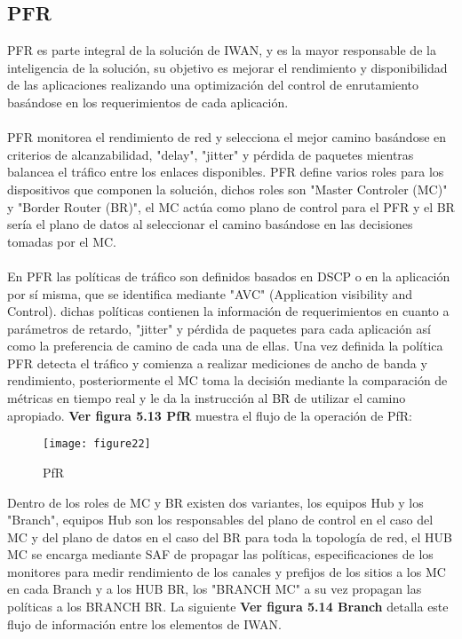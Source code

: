 \subsection{PFR}
\label{sec:PFR}

PFR es parte integral de la solución de IWAN, y es la mayor responsable de la inteligencia de la solución, su objetivo es mejorar el rendimiento y disponibilidad de las aplicaciones realizando una optimización del control de enrutamiento basándose en los requerimientos de cada aplicación. 
\\
\\
PFR monitorea el rendimiento de red y selecciona el mejor camino basándose en criterios de alcanzabilidad, "delay", "jitter" y pérdida de paquetes mientras balancea el tráfico entre los enlaces disponibles.
PFR define varios roles para los dispositivos que componen la solución, dichos roles son "Master Controler (MC)" y "Border Router (BR)", el MC actúa como plano de control para el PFR y el BR sería el plano de datos al seleccionar el camino basándose en las decisiones tomadas por el MC.
\\
\\
En PFR las políticas de tráfico son definidos basados en DSCP o en la aplicación por sí misma, que se identifica mediante "AVC" (Application visibility and Control). dichas políticas contienen la información de requerimientos en cuanto a parámetros de retardo, "jitter" y pérdida de paquetes para cada aplicación así como la preferencia de camino de cada una de ellas. Una vez definida la política PFR detecta el tráfico y comienza a realizar mediciones de ancho de banda y rendimiento, posteriormente el MC toma la decisión mediante la comparación de métricas en tiempo real y le da la instrucción al BR de utilizar el camino apropiado. \textbf{Ver figura 5.13 PfR} muestra el flujo de la operación de PfR:

\begin{figure}[htbp]
  \centering
    {\texttt{[image: figure22]}}%
  \caption{PfR}
  \label{fig:fig2subfig}
\end{figure}

Dentro de los roles de MC y BR existen dos variantes, los equipos Hub y los "Branch", equipos Hub son los responsables del plano de control en el caso del MC y del plano de datos en el caso del BR para toda la topología de red, el HUB MC se encarga mediante SAF de propagar las políticas, especificaciones de los monitores para medir rendimiento de los canales y prefijos de los sitios a los MC en cada Branch y a los HUB BR, los "BRANCH MC" a su vez propagan las políticas a los BRANCH BR. La siguiente \textbf{Ver figura 5.14 Branch} detalla este flujo de información entre los elementos de IWAN. 

